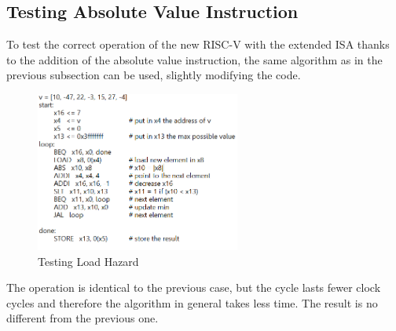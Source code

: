 \subsection{Testing Absolute Value Instruction}
\label{subs:testAbs}
To test the correct operation of the new RISC-V with the extended ISA thanks to the addition of the absolute value instruction, the same algorithm as in the previous subsection can be used, slightly modifying the code.
\begin{figure}[H]
	\centering
	\includegraphics[width=0.6\textwidth]{sec3/images/test9.png}
	\caption{Testing Load Hazard}
	\label{fig:test9}
\end{figure}
\noindent The operation is identical to the previous case, but the cycle lasts fewer clock cycles and therefore the algorithm in general takes less time. The result is no different from the previous one.